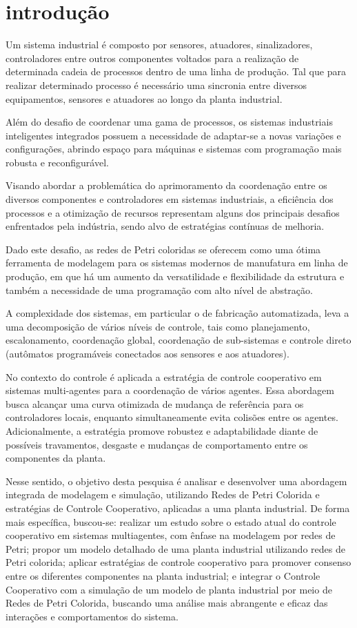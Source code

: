 \chapter{introdução}
\label{chap:introduction}
 Um sistema industrial é composto por sensores, atuadores, sinalizadores, controladores entre outros componentes voltados para a realização de determinada cadeia de processos dentro de uma linha de produção. Tal que para realizar determinado processo é necessário uma sincronia entre diversos equipamentos, sensores e atuadores ao longo da planta industrial. 
 
Além do desafio de coordenar uma gama de processos, os sistemas industriais inteligentes integrados possuem a necessidade de adaptar-se a novas variações e configurações, abrindo espaço para máquinas e sistemas com programação mais robusta e reconfigurável. 

Visando abordar a problemática do aprimoramento da coordenação entre os diversos componentes e controladores em sistemas industriais, a eficiência dos processos e a otimização de recursos representam alguns dos principais desafios enfrentados pela indústria, sendo alvo de estratégias contínuas de melhoria.

Dado este desafio, as redes de Petri coloridas se oferecem como uma ótima ferramenta de modelagem para os sistemas modernos de manufatura em linha de produção, em que há um aumento da versatilidade e flexibilidade da estrutura e também a necessidade de uma programação com alto nível de abstração.  \cite{framework}

A complexidade dos sistemas, em particular o de fabricação automatizada, leva a uma decomposição de vários níveis de controle, tais como planejamento, escalonamento, coordenação global, coordenação de sub-sistemas e controle direto (autômatos programáveis conectados aos sensores e aos atuadores).  \cite{vallete}

No contexto do controle é aplicada a estratégia de controle cooperativo em sistemas multi-agentes para a coordenação de vários agentes. Essa abordagem busca alcançar uma curva otimizada de mudança de referência para os controladores locais, enquanto simultaneamente evita colisões entre os agentes. Adicionalmente, a estratégia promove robustez e adaptabilidade diante de possíveis travamentos, desgaste e mudanças de comportamento entre os componentes da planta.

Nesse sentido, o objetivo desta pesquisa é analisar e desenvolver uma abordagem integrada de modelagem e simulação, utilizando Redes de Petri Colorida e estratégias de Controle Cooperativo, aplicadas a uma planta industrial. 
De forma mais específica, buscou-se: realizar um estudo sobre o estado atual do controle cooperativo em sistemas multiagentes, com ênfase na modelagem por redes de Petri; propor um modelo detalhado de uma planta industrial utilizando redes de Petri colorida; aplicar estratégias de controle cooperativo para promover consenso entre os diferentes componentes na planta industrial; e integrar o Controle Cooperativo com a simulação de um modelo de planta industrial por meio de Redes de Petri Colorida, buscando uma análise mais abrangente e eficaz das interações e comportamentos do sistema. 

